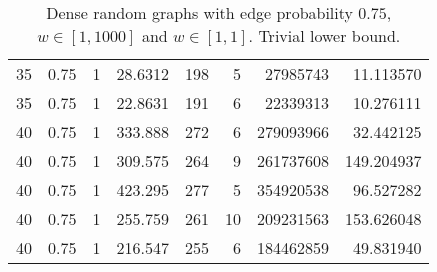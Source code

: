 \documentclass[a4paper,11pt]{article}
\begin{document}
\begin{table}
\begin{center}
\begin{tabular}{|rrr|r|r|rr|r|}
35 & 0.75 & 1 & 28.6312 & 198 & 5 & 27985743 & 11.113570 \\
35 & 0.75 & 1 & 22.8631 & 191 & 6 & 22339313 & 10.276111 \\
40 & 0.75 & 1 & 333.888 & 272 & 6 & 279093966 & 32.442125 \\
40 & 0.75 & 1 & 309.575 & 264 & 9 & 261737608 & 149.204937 \\
40 & 0.75 & 1 & 423.295 & 277 & 5 & 354920538 & 96.527282 \\
40 & 0.75 & 1 & 255.759 & 261 & 10 & 209231563 & 153.626048 \\
40 & 0.75 & 1 & 216.547 & 255 & 6 & 184462859 & 49.831940 \\
\hline
\end{tabular}
\end{center}
\caption{Dense random graphs with edge probability $0.75$,
  $w\in[1,1000]$ and $w\in[1,1]$. Trivial lower bound.}
\label{tab:dense-norebal}
\end{table}
\end{document}
